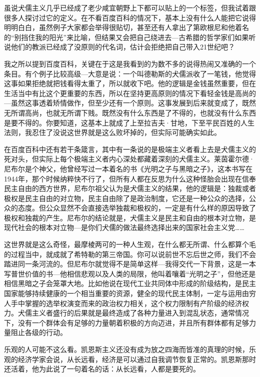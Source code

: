 虽说犬儒主义几乎已经成了老少咸宜朝野上下都可以贴上的一个标签，但我试着跟很多人探讨过它的定义。在不看百度百科的情况下，基本上没有什么人能把它说得明明白白，虽然例子大家都会举得很贴切，甚至还有人拿出了第欧根尼和他着名的``别挡住我的阳光''来比喻，但结果又会把自己绕进去---古希腊的哲学家们如果听说他们的教派已经成了没原则的代名词，估计会拒绝把自己带入21世纪吧？

我之所以提到百度百科，关键在于这是我看到的为数不多的说得热闹又准确的一个条目。有个例子比较高级---大意是说：一个叫德勒斯的犬儒派收了一笔钱，他觉得这事如果拒绝就把钱看得太重了，所以就收下吧。他的逻辑是金钱虽然重要，但在生活当中有比这个更重要的东西，所以在坚持更高原则的情况下看轻金钱是高尚的---虽然这事透着矫情做作，但至少还有一个原则。这事发展到后来就变成了，既然无所谓高尚，也就无所谓下贱。既然没有什么东西是了不得的，也就没有什么东西是要不得的。你要知道，这基本上就成了上至拉吉夫·甘地，下至平民百姓的人生法则，我忍住了没说这世界就是这么败坏掉的，但实际可能确实如此。

在百度百科中还有若干条箴言，其中有一条说的是极端主义者看上去是犬儒主义的死对头，但实际上每个极端主义者内心深处都藏着深刻的犬儒主义。莱茵霍尔德·尼布尔是个神父，他曾经写过一本着名的书《光明之子与黑暗之子》，这本书写在1944年，那个时候纳粹快不行了，但所有人都在反思为什么这种怪胎会出现在信奉民主自由的西方世界，尼布尔祖父认为是犬儒主义的结果，他的逻辑是：独裁或者极权是民主自由的对立物，民主自由除了是政治制度，它还是一种公众的选择，公众的态度。但公众显然不会直接选举独裁和极权的，一定是有什么样的原因导致了极权和独裁的产生。尼布尔的结论就是，犬儒主义是民主和自由的根本对立物，是现代社会的根本对立物---是你们犬儒的做法最终选择出来的国家社会主义党\ldots\ldots{}

这世界就是这么奇怪，最摩棱两可的一种人生观，在什么都无所谓、什么都算个毛的过程当中，就成就了希特勒的第三帝国。你可以说前世不忘后世之师，我们不会踏进同一条河流的。但尼布尔就觉得不是简单这样---我得交代一下背景，这是一本写普世价值的书---他相信悲观以及人类的局限，他叫着嚷着``光明之子''，但他还是相信黑暗之子会笼罩大地。比如他说在现代工业共同体中形成的阶级结构，是民主国家能够持续健康的一个相当重要的资源，健全的现代民主体制，一定与运用由穷人手中掌握的选举权演变而来的政治权力相关，这个权力限制有产阶级的经济权力。犬儒主义者盛行的后果就是最终造成了各种力量进入到混乱状态，通常情况下，没有一个群体会有足够的力量朝着积极的方向迈进，并且所有群体都有足够力量阻止各级的行动。

乐观的人可能不这么看。凯恩斯主义还没有成为放之四海而皆准的真理的时候，乐观的经济学家会说，从长远看，经济是可以通过自我调节恢复正常的。凯恩斯那时还活着，他为此说了一句着名的话：从长远看，人都是要死的。

